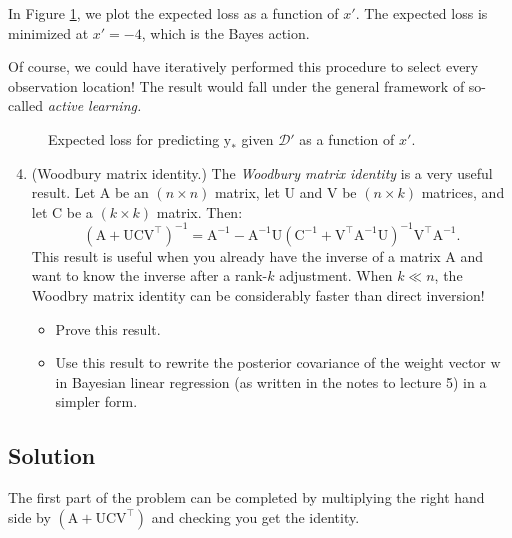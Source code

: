 \documentclass{article}
\newcommand{\mc}[1]{\mathcal{#1}}
\newcommand{\data}{\mc{D}}
\newcommand{\mat}[1]{\bm{\mathrm{#1}}}
\renewcommand{\vec}[1]{\bm{\mathrm{#1}}}
\newcommand{\trans}{^\top}
\newcommand{\inv}{^{-1}}
\begin{document}
In Figure \ref{problem_3}, we plot the expected loss as a function of
$x'$.  The expected loss is minimized at $x' = -4$, which is the Bayes
action.

Of course, we could have iteratively performed this procedure to
select every observation location!  The result would fall under the
general framework of so-called \emph{active learning.}

\begin{figure}
  \centering
  
  \caption{Expected loss for predicting $\vec{y}_\ast$ given $\data'$
    as a function of $x'$.}
  \label{problem_3}
\end{figure}

\clearpage
\begin{enumerate}
\setcounter{enumi}{3}
\item
  (Woodbury matrix identity.)
  The \emph{Woodbury matrix identity} is a very useful result.  Let
  $\mat{A}$ be an $(n \times n)$ matrix, let $\mat{U}$ and $\mat{V}$
  be $(n \times k)$ matrices, and let $\mat{C}$ be a $(k \times k)$
  matrix.  Then:
  \begin{equation*}
    (\mat{A} + \mat{U}\mat{C}\mat{V}\trans)\inv
    =
    \mat{A}\inv
    -
    \mat{A}\inv
    \mat{U}
    (\mat{C}\inv + \mat{V}\trans \mat{A}\inv \mat{U})\inv
    \mat{V}\trans
    \mat{A}\inv.
  \end{equation*}
  This result is useful when you already have the inverse of a matrix
  $\mat{A}$ and want to know the inverse after a rank-$k$ adjustment.
  When $k \ll n$, the Woodbry matrix identity can be considerably
  faster than direct inversion!
  \begin{itemize}
  \item
    Prove this result.
  \item
    Use this result to rewrite the posterior covariance of the weight
    vector $\vec{w}$ in Bayesian linear regression (as written in the
    notes to lecture 5) in a simpler form.
  \end{itemize}
\end{enumerate}

\subsection*{Solution}

The first part of the problem can be completed by multiplying the
right hand side by $(\mat{A} + \mat{U}\mat{C}\mat{V}\trans)$ and
checking you get the identity.
\end{document}

